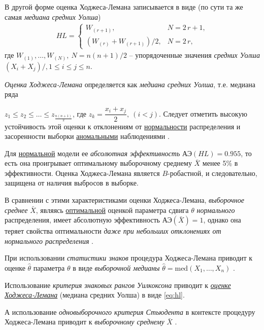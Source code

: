\documentclass[%
	11pt,
	a4paper,
	utf8,
		]{article}
\begin{document}
В другой форме оценка Ходжеса-Лемана записывается в виде (по сути та же самая \emph{медиана средних Уолша}) \cite{shulenin:robast-hl}
\begin{align*}
	HL = 
	\begin{cases}
		W_{(r + 1)}, &N = 2\,r + 1, \\
		(W_{(r)} + W_{(r + 1)}) / 2, &N = 2\,r,
	\end{cases}
\end{align*}
где $ W_{(1)}, \ldots, W_{(N)}, \ N = n(n+1)/2 $ -- упорядоченные значения \emph{средних Уолша} $ (X_i + X_j) / , 1 \leqslant i \leqslant j \leqslant n $.

\emph{\color{blue}Оценка Ходжеса-Лемана} определяется как \emph{\color{blue}медиана средних Уолша}, т.е. медиана ряда

$ z_1 \leqslant z_2 \leqslant \ldots \leqslant z_{ \frac{n(n+1)}{2} } $, где $ z_k = \dfrac{x_i + x_j}{2}, \ (i < j) $. Следует отметить высокую устойчивость этой оценки к отклонениям от \underline{нормальности} распределения и засоренности выборки \underline{аномальными} наблюдениями \cite[]{kobzar:2012}.

Для \underline{нормальной} модели ее \emph{абсолютная эффективность} $ \text{АЭ}(HL) = 0.955 $, то есть она проигрывает оптимальному выборочному среднему $ \bar{X} $ менее 5\% в эффективности. Оценка Ходжеса-Лемана является $ B $-робастной, и следовательно, защищена от наличия выбросов в выборке. 

В сравнении с этими характеристиками оценки Ходжеса-Лемана, \emph{выборочное среднее} $ \bar{X} $, являясь \underline{оптимальной} оценкой параметра сдвига $ \theta $ \emph{нормального} распределения, имеет абсолютную эффективность $ \text{АЭ}(\bar{X}) = 1 $, однако она теряет свойства оптимальности {\color{deepred}\itshape даже при небольших отклонениях от нормального распределения} \cite{shulenin:hl}.

При использовании \emph{статистики знаков} процедура Ходжеса-Лемана приводит к оценке $ \hat{\theta} $ параметра $ \theta $ в виде \emph{выборочной медианы} $ \hat{\theta} = \text{med} (X_1, \ldots, X_n) $ \cite[]{shulenin:nonparam}.

Использование \emph{критерия знаковых рангов Уилкоксона} приводит к \underline{\itshape оценке Ходжеса-Лемана} (медиана средних Уолша) \cite[, ]{shulenin:nonparam} в виде \eqref{eq:hl}.


А использование \emph{одновыборочного критерия Стьюдента} в контексте процедуру Ходжеса-Лемана приводит к \emph{выборочному среднему} $ \bar{X} $ \cite[]{shulenin:nonparam}.
\end{document}
